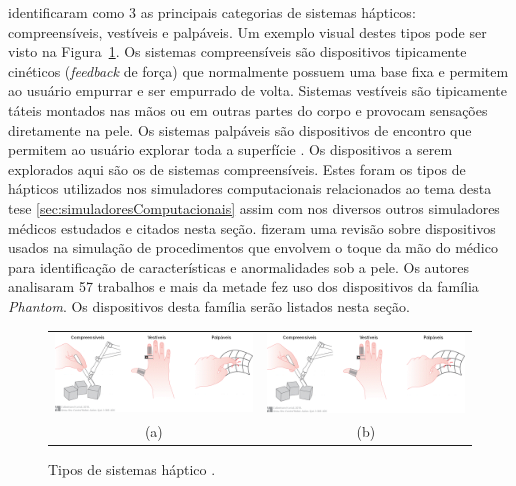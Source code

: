 \textcite{Culbertson2018} identificaram como 3 as principais categorias de sistemas hápticos: compreensíveis, vestíveis e palpáveis. Um exemplo visual destes tipos pode ser visto na Figura~\ref{fig:tiposHapticos}. Os sistemas compreensíveis são dispositivos tipicamente cinéticos (\textit{feedback} de força) que normalmente possuem uma base fixa e permitem ao usuário empurrar e ser empurrado de volta. Sistemas vestíveis são tipicamente táteis montados nas mãos ou em outras partes do corpo e provocam sensações diretamente na pele. Os sistemas palpáveis são dispositivos de encontro que permitem ao usuário explorar toda a superfície \cite{Culbertson2018}. Os dispositivos a serem explorados aqui são os de sistemas compreensíveis. Estes foram os tipos de hápticos utilizados nos simuladores computacionais relacionados ao tema desta tese \ref{sec:simuladoresComputacionais} assim com nos diversos outros simuladores médicos estudados e citados nesta seção. \textcite{Ribeiro2016} fizeram uma revisão sobre dispositivos usados na simulação de procedimentos que envolvem o toque da mão do médico para identificação de características e anormalidades sob a pele. Os autores analisaram 57 trabalhos e mais da metade fez uso dos dispositivos da família \textit{Phantom}. Os dispositivos desta família serão listados nesta seção.

\begin{figure}[ht!]
    \centering
    \begin{table}[]
    \begin{tabular}{cc}
     \includegraphics[width=0.6\linewidth]{capitulos/figuras/tipos.hapticos-portugues.png} & \includegraphics[width=0.6\linewidth]{capitulos/figuras/tipos.hapticos-portugues.png}  \\
    (a) & (b)
    \end{tabular}
    \end{table}
    
    \caption{Tipos de sistemas háptico \cite{Culbertson2018}.}
    \label{fig:tiposHapticos}
\end{figure}

